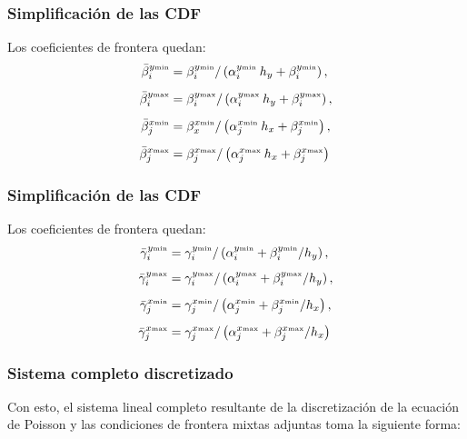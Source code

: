 \documentclass[12pt]{beamer}
\begin{document}
\begin{frame}
\frametitle{Simplificación de las CDF}
Los coeficientes de frontera quedan:
\pause
\begin{align}
\begin{aligned}
\bar{\beta}_{i}^{y {\text{\tiny{min}}}} &= \beta_{i}^{y {\text{\tiny{min}}}} / \left( \alpha_{i}^{y {\text{\tiny{min}}}} \: h_{y}  + \beta_{i}^{y{\mbox{\tiny{min}}}} \right), \\[0.5em]
\bar{\beta}_{i}^{y {\text{\tiny{max}}}} &= \beta_{i}^{y {\text{\tiny{max}}}} / \left( \alpha_{i}^{y {\text{\tiny{max}}}} \: h_{y}  + \beta_{i}^{y{\mbox{\tiny{max}}}} \right), \\[0.5em]
\bar{\beta}_{j}^{x {\text{\tiny{min}}}} &= \beta_{x}^{x {\text{\tiny{min}}}} / \left( \alpha_{j}^{x {\text{\tiny{min}}}} \: h_{x}  + \beta_{j}^{x {\mbox{\tiny{min}}}} \right), \\[0.5em]
\bar{\beta}_{j}^{x {\text{\tiny{max}}}} &= \beta_{j}^{x {\text{\tiny{max}}}} / \left( \alpha_{j}^{x {\text{\tiny{max}}}} \: h_{x}  + \beta_{j}^{x {\mbox{\tiny{max}}}} \right)
\end{aligned}
\label{eq:ecuacion_13_08a}
\end{align}
\end{frame}
\begin{frame}
\frametitle{Simplificación de las CDF}
Los coeficientes de frontera quedan:
\pause
\begin{align}
\begin{aligned}
\bar{\gamma}_{i}^{y {\text{\tiny{min}}}} &= \gamma_{i}^{y {\text{\tiny{min}}}} / \left( \alpha_{i}^{y {\text{\tiny{min}}}} + \beta_{i}^{y{\text{\tiny{min}}}} / h_{y} \right), \\[0.5em]
\bar{\gamma}_{i}^{y {\text{\tiny{max}}}} &= \gamma_{i}^{y {\text{\tiny{max}}}} / \left( \alpha_{i}^{y {\text{\tiny{max}}}} + \beta_{i}^{y{\text{\tiny{max}}}} / h_{y} \right), \\[0.5em]
\bar{\gamma}_{j}^{x {\text{\tiny{min}}}} &= \gamma_{j}^{x {\text{\tiny{min}}}} / \left( \alpha_{j}^{x {\text{\tiny{min}}}} + \beta_{j}^{x {\text{\tiny{min}}}} / h_{x} \right), \\[0.5em]
\bar{\gamma}_{j}^{x {\text{\tiny{max}}}} &= \gamma_{j}^{x {\text{\tiny{max}}}} / \left( \alpha_{j}^{x {\text{\tiny{max}}}} + \beta_{j}^{x {\text{\tiny{max}}}} / h_{x} \right)
\end{aligned}
\label{eq:ecuacion_13_08b}
\end{align}
\end{frame}
\begin{frame}
\frametitle{Sistema completo discretizado}
Con esto, el sistema lineal completo resultante de la discretización de la ecuación de Poisson y las condiciones de frontera mixtas adjuntas toma la siguiente forma:
\end{frame}
\end{document}
